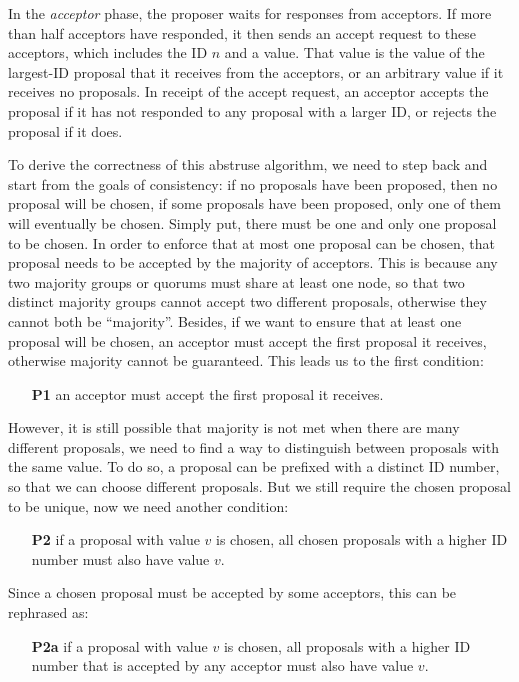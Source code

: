 \documentclass[11pt]{article}
\begin{document}
    In the \textit{acceptor} phase, the proposer waits for responses from acceptors. If more than half acceptors have responded, it then sends an accept request to these acceptors, which includes the \small{ID} \normalsize $n$ and a value. That value is the value of the largest-\small{ID} \normalsize proposal that it receives from the acceptors, or an arbitrary value if it receives no proposals. In receipt of the accept request, an acceptor accepts the proposal if it has not responded to any proposal with a larger \small{ID}\normalsize, or rejects the proposal if it does.

    To derive the correctness of this abstruse algorithm, we need to step back and start from the goals of consistency: if no proposals have been proposed, then no proposal will be chosen, if some proposals have been proposed, only one of them will eventually be chosen. Simply put, there must be one and only one proposal to be chosen. In order to enforce that at most one proposal can be chosen, that proposal needs to be accepted by the majority of acceptors. This is because any two majority groups or quorums must share at least one node, so that two distinct majority groups cannot accept two different proposals, otherwise they cannot both be “majority”. Besides, if we want to ensure that at least one proposal will be chosen, an acceptor must accept the first proposal it receives, otherwise majority cannot be guaranteed. This leads us to the first condition:
    \begin{itemize}
      \item[\textbf{P1}] an acceptor must accept the first proposal it receives.
    \end{itemize}
    However, it is still possible that majority is not met when there are many different proposals, we need to find a way to distinguish between proposals with the same value. To do so, a proposal can be prefixed with a distinct \small{ID} \normalsize number, so that we can choose different proposals. But we still require the chosen proposal to be unique, now we need another condition:
    \begin{itemize}
      \item[\textbf{P2}] if a proposal with value $v$ is chosen, all chosen proposals with a higher \small{ID} \normalsize number must also have value $v$.
    \end{itemize}
    Since a chosen proposal must be accepted by some acceptors, this can be rephrased as:
    \begin{itemize}
      \item[\textbf{P2a}] if a proposal with value $v$ is chosen, all proposals with a higher \small{ID} \normalsize number that is accepted by any acceptor must also have value $v$.
    \end{itemize}
\end{document}
